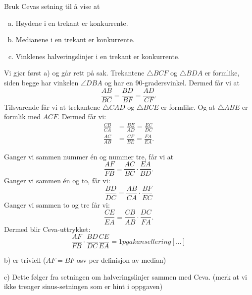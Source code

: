 \documentclass[11pt, norsk]{article}
\begin{document}
\begin{oppg}
 Bruk Cevas setning til å vise at
 \begin{enumerate}[a)]
 \item  Høydene i en trekant er konkurrente.
 \item Medianene i en trekant er konkurrente.
 \item Vinklenes halveringslinjer i en trekant er konkurrente.
 \end{enumerate}
\end{oppg}
\begin{losn}
Vi gjør først a) og går rett på sak. Trekantene $\triangle BCF$ og $\triangle BDA$ er formlike, siden begge har vinkelen $\angle DBA$ og har en $90$-gradersvinkel. Dermed får vi at
$$
\frac{AB}{BC}=\frac{BD}{BF}=\frac{AD}{CF}.
$$
Tilsvarende får vi at trekantene $\triangle CAD$ og $\triangle BCE$ er formlike. Og at $\triangle ABE$ er formlik med $ACF$. Dermed får vi:
\begin{align*}
 \frac{CB}{CA} &= \frac{BE}{AD}= \frac{EC}{DC} \\
 \frac{AC}{AB} &= \frac{CF}{BE} = \frac{FA}{EA}.
\end{align*}

Ganger vi sammen nummer én og nummer tre, får vi at 
$$
\frac{AF}{FB} = \frac{AC}{BC}\cdot \frac{EA}{BD}.
$$
Ganger vi sammen én og to, får vi:
$$
\frac{BD}{DC} = \frac{AB}{CA} \cdot \frac{BF}{EC}
$$
Ganger vi sammen to og tre får vi:
$$
\frac{CE}{EA} = \frac{CB}{AB} \cdot \frac{DC}{FA}.
$$
Dermed blir Ceva-uttrykket:
$$
\frac{AF}{FB} \cdot \frac{BD}{DC} \frac{CE}{EA} = 1 pga kansellering [...]
$$

b) er triviell ($AF=BF$ osv per definisjon av median)

c) Dette følger fra setningen om halveringslinjer sammen med Ceva. (merk at vi ikke trenger sinus-setningen som er hint i oppgaven) 



\end{losn}
\end{document}
